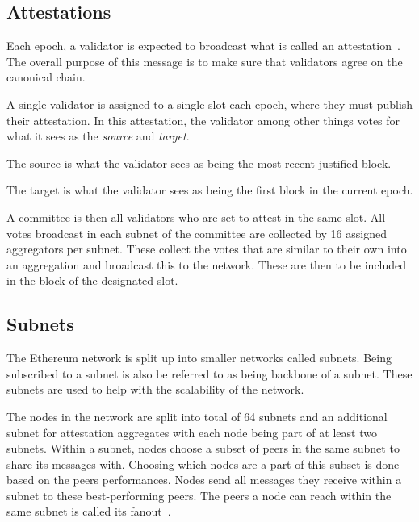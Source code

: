 \subsection{Attestations}\label{subsec:attestations}
Each epoch, a validator is expected to broadcast what is called an attestation~\cite{attestations}.
The overall purpose of this message is to make sure that validators agree on the canonical chain.

A single validator is assigned to a single slot each epoch, where they must publish their attestation.
In this attestation, the validator among other things votes for what it sees as the \textit{source} and \textit{target}.

The source is what the validator sees as being the most recent justified block.

The target is what the validator sees as being the first block in the current epoch.

A committee is then all validators who are set to attest in the same slot.
All votes broadcast in each subnet of the committee are collected by 16 assigned aggregators per subnet.
These collect the votes that are similar to their own into an aggregation and broadcast this to the network.
These are then to be included in the block of the designated slot.

\subsection{Subnets}\label{subsec:subnets}
The Ethereum network is split up into smaller networks called subnets.
Being subscribed to a subnet is also be referred to as being backbone of a subnet.
These subnets are used to help with the scalability of the network.

The nodes in the network are split into total of 64 subnets and an additional subnet for attestation aggregates with each node being part of at least two subnets.
Within a subnet, nodes choose a subset of peers in the same subnet to share its messages with.
Choosing which nodes are a part of this subset is done based on the peers performances.
Nodes send all messages they receive within a subnet to these best-performing peers.
The peers a node can reach within the same subnet is called its fanout~\cite{heimbach2024deanonymizingethereumvalidatorsp2p}.



